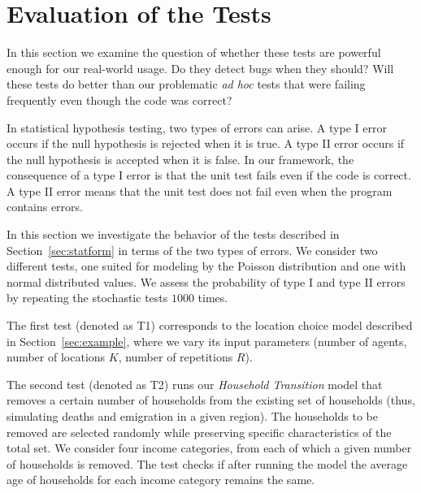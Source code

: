 
\section{Evaluation of the Tests}
\label{sec:power}
%
In this section we examine the question of
whether these tests are powerful enough for our 
real-world usage.  Do they detect bugs when they should?  Will these tests do 
better than our problematic \emph{ad hoc} tests that were failing frequently 
even though the code was correct?

In statistical hypothesis testing, two types of errors can arise.  A type I
error occurs if the null hypothesis is rejected when it is true. A type II
error occurs if the null hypothesis is accepted when it is false. 
In our framework, the
consequence of a type I error is that the unit test fails
even if the code is correct. A type II error means that the unit test does
not fail even when the program contains errors. 

In this section we investigate the behavior of the tests described in
Section~\ref{sec:statform} in terms of the two types of errors. We consider
two different tests, one suited for modeling by the Poisson distribution and
one with normal distributed values.  We assess the probability of type I and
type II errors by repeating the stochastic tests $1000$ times.

The first test (denoted as T1) corresponds to the location choice
model described in Section~\ref{sec:example}, where we vary its input
parameters (number of agents, number of locations $K$, number of repetitions
$R$).

The second test (denoted as T2) runs our \emph{Household Transition} model that removes a
certain number of households from the existing set of households (thus,
simulating deaths and emigration in a given region). The households to be
removed are selected randomly while preserving specific characteristics of the
total set. We consider four income categories, from each of which a given
number of households is removed. The test checks if after running the model
the average age of households for each income category remains the same.

